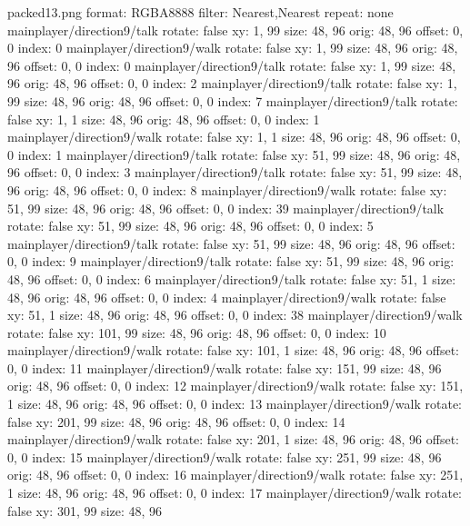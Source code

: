 packed13.png
format: RGBA8888
filter: Nearest,Nearest
repeat: none
mainplayer/direction9/talk
  rotate: false
  xy: 1, 99
  size: 48, 96
  orig: 48, 96
  offset: 0, 0
  index: 0
mainplayer/direction9/walk
  rotate: false
  xy: 1, 99
  size: 48, 96
  orig: 48, 96
  offset: 0, 0
  index: 0
mainplayer/direction9/talk
  rotate: false
  xy: 1, 99
  size: 48, 96
  orig: 48, 96
  offset: 0, 0
  index: 2
mainplayer/direction9/talk
  rotate: false
  xy: 1, 99
  size: 48, 96
  orig: 48, 96
  offset: 0, 0
  index: 7
mainplayer/direction9/talk
  rotate: false
  xy: 1, 1
  size: 48, 96
  orig: 48, 96
  offset: 0, 0
  index: 1
mainplayer/direction9/walk
  rotate: false
  xy: 1, 1
  size: 48, 96
  orig: 48, 96
  offset: 0, 0
  index: 1
mainplayer/direction9/talk
  rotate: false
  xy: 51, 99
  size: 48, 96
  orig: 48, 96
  offset: 0, 0
  index: 3
mainplayer/direction9/talk
  rotate: false
  xy: 51, 99
  size: 48, 96
  orig: 48, 96
  offset: 0, 0
  index: 8
mainplayer/direction9/walk
  rotate: false
  xy: 51, 99
  size: 48, 96
  orig: 48, 96
  offset: 0, 0
  index: 39
mainplayer/direction9/talk
  rotate: false
  xy: 51, 99
  size: 48, 96
  orig: 48, 96
  offset: 0, 0
  index: 5
mainplayer/direction9/talk
  rotate: false
  xy: 51, 99
  size: 48, 96
  orig: 48, 96
  offset: 0, 0
  index: 9
mainplayer/direction9/talk
  rotate: false
  xy: 51, 99
  size: 48, 96
  orig: 48, 96
  offset: 0, 0
  index: 6
mainplayer/direction9/talk
  rotate: false
  xy: 51, 1
  size: 48, 96
  orig: 48, 96
  offset: 0, 0
  index: 4
mainplayer/direction9/walk
  rotate: false
  xy: 51, 1
  size: 48, 96
  orig: 48, 96
  offset: 0, 0
  index: 38
mainplayer/direction9/walk
  rotate: false
  xy: 101, 99
  size: 48, 96
  orig: 48, 96
  offset: 0, 0
  index: 10
mainplayer/direction9/walk
  rotate: false
  xy: 101, 1
  size: 48, 96
  orig: 48, 96
  offset: 0, 0
  index: 11
mainplayer/direction9/walk
  rotate: false
  xy: 151, 99
  size: 48, 96
  orig: 48, 96
  offset: 0, 0
  index: 12
mainplayer/direction9/walk
  rotate: false
  xy: 151, 1
  size: 48, 96
  orig: 48, 96
  offset: 0, 0
  index: 13
mainplayer/direction9/walk
  rotate: false
  xy: 201, 99
  size: 48, 96
  orig: 48, 96
  offset: 0, 0
  index: 14
mainplayer/direction9/walk
  rotate: false
  xy: 201, 1
  size: 48, 96
  orig: 48, 96
  offset: 0, 0
  index: 15
mainplayer/direction9/walk
  rotate: false
  xy: 251, 99
  size: 48, 96
  orig: 48, 96
  offset: 0, 0
  index: 16
mainplayer/direction9/walk
  rotate: false
  xy: 251, 1
  size: 48, 96
  orig: 48, 96
  offset: 0, 0
  index: 17
mainplayer/direction9/walk
  rotate: false
  xy: 301, 99
  size: 48, 96
